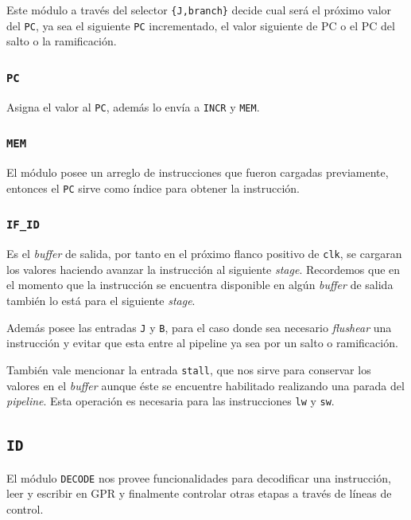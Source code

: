 \documentclass[a4paper]{article}
\begin{document}
Este módulo a través del selector \texttt{\{J,branch\}} decide cual será el próximo valor del \texttt{PC}, ya sea el siguiente \texttt{PC} incrementado, el valor siguiente de PC o el PC del salto o la ramificación.

\subsubsection{\texttt{PC}}
Asigna el valor al \texttt{PC}, además lo envía a \texttt{INCR} y \texttt{MEM}.

\subsubsection{\texttt{MEM}}

El módulo posee un arreglo de instrucciones que fueron cargadas previamente, entonces el \texttt{PC} sirve como índice para obtener la instrucción.

\subsubsection{\texttt{IF\_ID}}

Es el \textit{buffer} de salida, por tanto en el próximo flanco positivo de \texttt{clk}, se cargaran los valores haciendo avanzar la instrucción al siguiente \textit{stage}. Recordemos que en el momento que la instrucción se encuentra disponible en algún \textit{buffer} de salida también lo está para el siguiente \textit{stage}.

Además posee las entradas \texttt{J} y \texttt{B}, para el caso donde sea necesario \textit{flushear} una instrucción y evitar que esta entre al pipeline ya sea por un salto o ramificación.

También vale mencionar la entrada \texttt{stall}, que nos sirve para conservar los valores en el \textit{buffer} aunque éste se encuentre habilitado realizando una parada del \textit{pipeline}. Esta operación es necesaria para las instrucciones \texttt{lw} y \texttt{sw}.

\clearpage

\subsection{\texttt{ID}}
El módulo \texttt{DECODE} nos provee funcionalidades para decodificar una instrucción, leer y escribir en GPR y finalmente controlar otras etapas a través de líneas de control.
\end{document}

